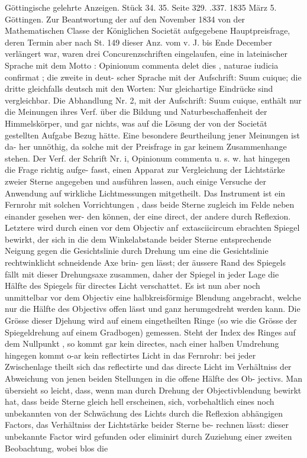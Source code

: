 \documentclass[12pt,a4paper]{article}
\begin{document}
{{{{{{{{Göttingische  gelehrte  Anzeigen.     Stück  34.  35.     Seite  329.  .337.     1835  März  5. Göttingen.  Zur  Beantwortung  der  auf  den  November  1834  von  der  Mathematischen  Classe  der Königlichen  Societät  aufgegebene  Hauptpreisfrage,  deren  Termin  aber  nach  St.  149  dieser  Anz.  vom  v. J.  bis  Ende  December  verlängert  war,  waren  drei  Concurenzschriften  eingelaufen,  eine  in  lateinischer Sprache  mit  dem  Motto :  Opinionum  commenta  delet  dies ,  naturae  iudicia  confirmat ;  die  zweite  in  deut- scher Sprache  mit  der  Aufschrift:  Suum  cuique;  die  dritte  gleichfalls  deutsch  mit  den  Worten:  Nur gleichartige  Eindrücke  sind  vergleichbar. Die  Abhandlung  Nr.  2,  mit  der  Aufschrift:  Suum  cuique,  enthält  nur  die  Meinungen  ihres  Verf. über  die  Bildung  und  Naturbeschaffenheit  der  Himmelskörper,  und  gar  nichts,  was  auf  die  Lösung  der von  der  Societät  gestellten  Aufgabe  Bezug  hätte.  Eine  besondere  ßeurtheilung  jener  Meinungen  ist  da- her unnöthig,  da  solche  mit  der  Preisfrage  in  gar  keinem  Zusammenhange  stehen. Der  Verf.  der  Schrift  Nr.  i,  Opinionum  commenta  u.  s.  w.  hat  hingegen  die  Frage  richtig  aufge- fasst,  einen  Apparat  zur  Vergleichung  der  Lichtstärke  zweier  Sterne  angegeben  und  ausführen  lassen, auch  einige  Versuche  der  Anwendung  auf  wirkliche  Lichtmessungen  mitgetheilt.  Das  Instrument  ist  ein Fernrohr  mit  solchen  Vorrichtungen ,  dass  beide  Sterne  zugleich  im  Felde  neben  einander  gesehen  wer- den können,  der  eine  direct,  der  andere  durch  Reflexion.  Letztere  wird  durch  einen  vor  dem  Objectiv anf\	extasciicircum{}{ }ebrachten  Spiegel  bewirkt,  der  sich  in  die  dem  Winkelabstande  beider  Sterne  entsprechende  Neigung gegen  die  Gesichtslinie  durch  Drehung  um  eine  die  Gesichtslinie  rechtwinklicht  schneidende  Axe  brin- gen lässt;  der  äussere  Rand  des  Spiegels  fällt  mit  dieser  Drehungsaxe  zusammen,  daher  der  Spiegel  in jeder  Lage  die  Hälfte  des  Spiegels  für  directes  Licht  verschattet.  Es  ist  nun  aber  noch  unmittelbar vor  dem  Objectiv  eine  halbkreisförmige  Blendung  angebracht,  welche  nur  die  Hälfte  des  Objectivs  offen lässt  und  ganz  herumgedreht  werden  kann.  Die  Grösse  dieser  Djehung  wird  auf  einem  eingetheilten Ringe  (so  wie  die  Grösse  der  Spiegeldrehung  auf  einem  Gradbogen)  gemessen.  Steht  der  Index  des Ringes  auf  dem  Nullpunkt ,  so  kommt  gar  kein  directes,  nach  einer  halben  Umdrehung  hingegen  kommt o-ar  kein  reflectirtes  Licht  in  das  Fernrohr:  bei  jeder  Zwischenlage  theilt  sich  das  reflectirte  und  das directe  Licht  im  Verhältniss  der  Abweichung  von  jenen  beiden  Stellungen  in  die  offene  Hälfte  des  Ob- jectivs. Man  übersieht  so  leicht,  dass,  wenn  man  durch  Drehung  der  Objectivblendung  bewirkt  hat,  dass beide  Sterne  gleich  hell  erscheinen,  sich,  vorbehaltlich  eines  noch  unbekannten  von  der  Schwächung des  Lichts  durch  die  Reflexion  abhängigen  Factors,  das  Verhältniss  der  Lichtstärke  beider  Sterne  be- rechnen lässt:  dieser  unbekannte  Factor  wird  gefunden  oder  eliminirt  durch  Zuziehung  einer  zweiten Beobachtung,  wobei  blos  die  }}}}}}}}
\end{document}
